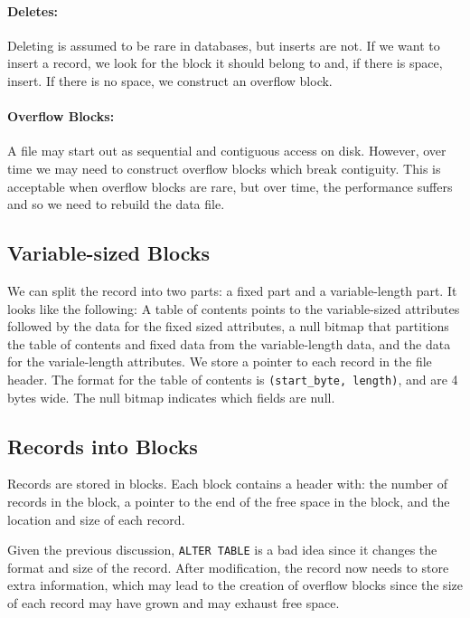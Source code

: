 \documentclass{report}
\newenvironment{aside}{\begin{tcolorbox}[title={Aside},colback=blue!5!white,colframe=black!75!blue]}{\end{tcolorbox}}
\renewcommand{\tt}[1]{\texttt{{#1}}}
\begin{document}
\paragraph{Deletes:} Deleting is assumed to be rare in databases, but inserts
are not. If we want to insert a record, we look for the block it should belong
to and, if there is space, insert. If there is no space, we construct an
overflow block.

\paragraph{Overflow Blocks:} A file may start out as sequential and contiguous
access on disk. However, over time we may need to construct overflow blocks
which break contiguity. This is acceptable when overflow blocks are rare, but
over time, the performance suffers and so we need to rebuild the data file.

\subsection{Variable-sized Blocks}
We can split the record into two parts: a fixed part and a variable-length part.
It looks like the following:
A table of contents points to the variable-sized attributes followed by the data
for the fixed sized attributes, a null bitmap that partitions the table of
contents and fixed data from the variable-length data, and the data for the
variale-length attributes. We store a pointer to each record in the file header.
The format for the table of contents is \tt{(start\_byte, length)}, and are 4
bytes wide. The null bitmap indicates which fields are null.

\subsection{Records into Blocks}
Records are stored in blocks. Each block contains a header with: the number of
records in the block, a pointer to the end of the free space in the block,
and the location and size of each record.

\begin{aside}
    Given the previous discussion, \tt{ALTER TABLE} is a bad idea since it
    changes the format and size of the record. After modification, the record
    now needs to store extra information, which may lead to the creation of
    overflow blocks since the size of each record may have grown and may exhaust
    free space.
\end{aside}
\end{document}
